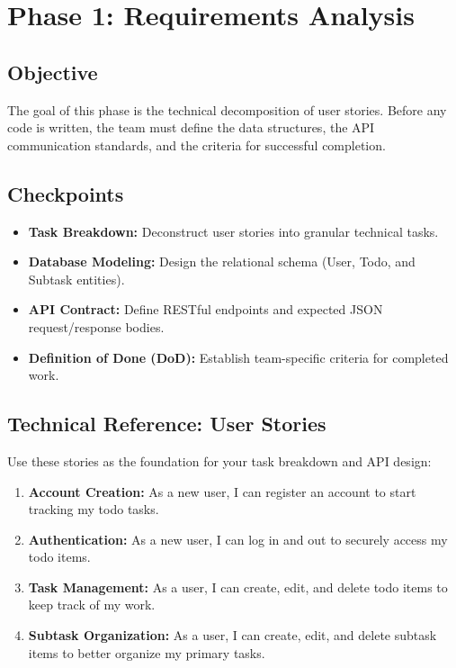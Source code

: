 

\section{Phase 1: Requirements Analysis}\label{sec:phase1}

\subsection{Objective}
The goal of this phase is the technical decomposition of user stories. Before any code is written,
the team must define the data structures, the API communication standards, and the criteria for
successful completion.

\subsection{Checkpoints}
\begin{itemize}
  \item[$\checkmark$] \textbf{Task Breakdown:} Deconstruct user stories into granular technical tasks.
  \item[$\checkmark$] \textbf{Database Modeling:} Design the relational schema (User, Todo, and Subtask entities).
  \item[$\checkmark$] \textbf{API Contract:} Define RESTful endpoints and expected JSON request/response bodies.
  \item[$\checkmark$] \textbf{Definition of Done (DoD):} Establish team-specific criteria for completed work.
\end{itemize}

\subsection{Technical Reference: User Stories}
Use these stories as the foundation for your task breakdown and API design:
\begin{enumerate}
  \item \textbf{Account Creation:} As a new user, I can register an account to start tracking my todo tasks.
  \item \textbf{Authentication:} As a new user, I can log in and out to securely access my todo items.
  \item \textbf{Task Management:} As a user, I can create, edit, and delete todo items to keep track of my work.
  \item \textbf{Subtask Organization:} As a user, I can create, edit, and delete subtask items to better organize my primary tasks.
\end{enumerate}


